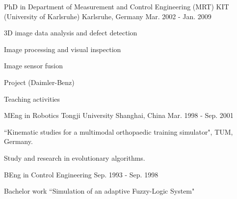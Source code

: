 \documentclass[../cv_xin.tex]{subfiles}
\begin{document}
\begin{cventries}
  \cventry
    {PhD in Department of Measurement and Control Engineering (MRT)} %
    {KIT (University of Karlsruhe)} %
    {Karlsruhe, Germany} %
    {Mar. 2002 - Jan. 2009} %
    {
      \begin{cvitems} %
        \item 3D image data analysis and defect detection \supercite{xin2008diss}
        \item Image processing and visual inspection \supercite{xin2009multiscale} \supercite{xin2007evaluation}
        \item Image sensor fusion \supercite{xin2004bildfolgenauswertung}
        \item Project (Daimler-Benz)  \supercite{Xin_Daimler_08}
        \item Teaching activities
      \end{cvitems}
    }

  \cventry
    {MEng in Robotics} %
    {Tongji University} %
    {Shanghai, China} %
    {Mar. 1998 - Sep. 2001} %
    {
      \begin{cvitems} %
        \item ``Kinematic studies for a multimodal orthopaedic training simulator", TUM, Germany. \supercite{xin2002KneeSimulator}
        \item Study and research in evolutionary algorithms. \supercite{xin2002AntColony}
      \end{cvitems}
    }

  \cventry
    {BEng in Control Engineering} %
    {} %
    {} %
    {Sep. 1993 - Sep. 1998} %
    {
      \begin{cvitems} %
        \item Bachelor work ``Simulation of an adaptive Fuzzy-Logic System"
      \end{cvitems}
    }

\end{cventries}
\end{document}
